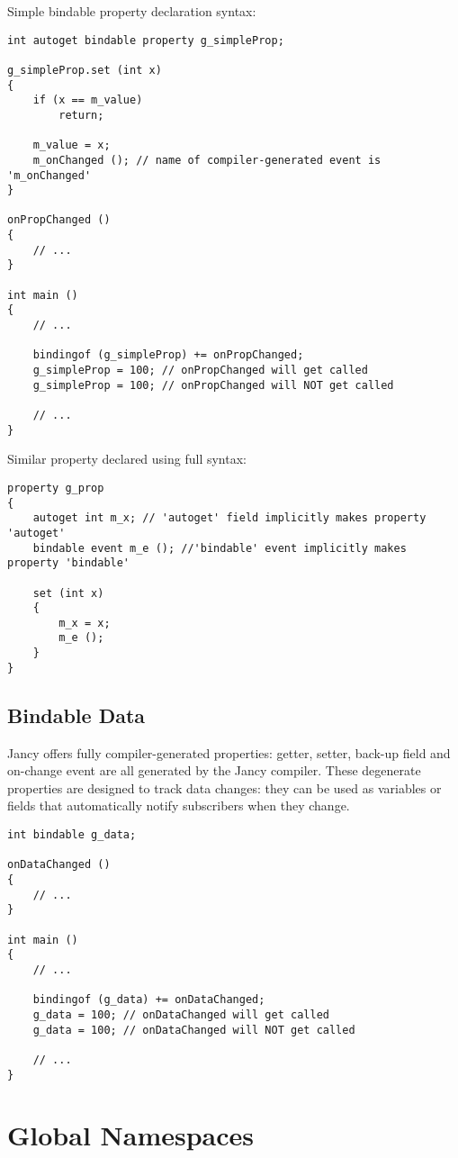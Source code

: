 \documentclass[oneside]{book}
\begin{document}
Simple bindable property declaration syntax:

\begin{lstlisting}
int autoget bindable property g_simpleProp;

g_simpleProp.set (int x)
{   
    if (x == m_value)
        return;

    m_value = x;
    m_onChanged (); // name of compiler-generated event is 'm_onChanged'
}

onPropChanged ()
{
    // ...
}

int main ()
{
    // ...

    bindingof (g_simpleProp) += onPropChanged;
    g_simpleProp = 100; // onPropChanged will get called
    g_simpleProp = 100; // onPropChanged will NOT get called

    // ...
}
\end{lstlisting}

Similar property declared using full syntax:

\begin{lstlisting}
property g_prop
{   
    autoget int m_x; // 'autoget' field implicitly makes property 'autoget'
    bindable event m_e (); //'bindable' event implicitly makes property 'bindable'

    set (int x)
    {
        m_x = x;
        m_e ();
    }
}
\end{lstlisting}

\subsection{Bindable Data}
Jancy offers fully compiler-generated properties: getter, setter, back-up field and on-change event are all generated by the Jancy compiler. These degenerate properties are designed to track data changes: they can be used as variables or fields that automatically notify subscribers when they change.

\begin{lstlisting}
int bindable g_data;

onDataChanged ()
{
    // ...
}

int main ()
{
    // ...

    bindingof (g_data) += onDataChanged;
    g_data = 100; // onDataChanged will get called
    g_data = 100; // onDataChanged will NOT get called

    // ...
}
\end{lstlisting}

\section{Global Namespaces}
\end{document}
